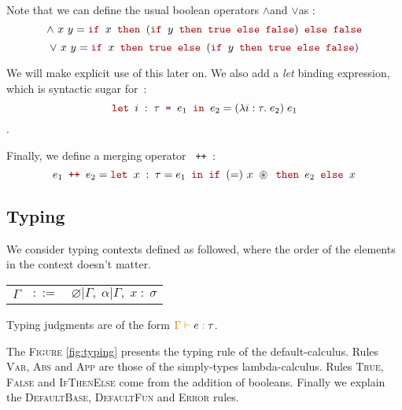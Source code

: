 \documentclass[11pt,a4paper]{article}
\newcommand{\synvar}[1]{\ensuremath{#1}}
\newcommand{\synkeyword}[1]{\textcolor{red!60!black}{\texttt{#1}}}
\newcommand{\synif}{\synkeyword{if~}}
\newcommand{\synthen}{\synkeyword{~then~}}
\newcommand{\synelse}{\synkeyword{~else~}}
\newcommand{\synlet}{\synkeyword{let~}}
\newcommand{\synin}{\synkeyword{~in~}}
\newcommand{\synequal}{\synkeyword{~=~}}
\newcommand{\syntrue}{\synkeyword{true}}
\newcommand{\synfalse}{\synkeyword{false}}
\newcommand{\synand}{\synvar{\wedge}}
\newcommand{\synor}{\synvar{\vee}}
\newcommand{\synmerge}{\synkeyword{~++~}}
\newcommand{\synerror}{\synvar{\circledast}}
\newcommand{\syndef}{$ ::= $}
\newcommand{\synalt}{\;$|$\;}
\newcommand{\syncolon}{\;:\;}
\newcommand{\synlambda}[3]{\ensuremath{\lambda#1:#2.\;#3}}
\newcommand{\typctx}[1]{\textcolor{orange!90!black}{\ensuremath{#1}}}
\newcommand{\typempty}{\typctx{\varnothing}}
\newcommand{\typcomma}{\typctx{,\;}}
\newcommand{\typvdash}{\typctx{\;\vdash\;}}
\newcommand{\typcolon}{\typctx{\;:\;}}
\begin{document}
Note that we can define the usual boolean operators \synand\;and \synor\;as :
$$\synand~\synvar{x}~\synvar{y} = \synif\synvar{x}\synthen(\synif\synvar{y}\synthen\syntrue\synelse\synfalse)\synelse\synfalse$$
$$\synor~\synvar{x}~\synvar{y} = \synif\synvar{x}\synthen\syntrue\synelse(\synif\synvar{y}\synthen\syntrue\synelse\synfalse)$$

We will make explicit use of this later on. We also add a \textit{let} binding expression, which is syntactic sugar for~:
$$\synlet\synvar{i}\syncolon\synvar{\tau}\synequal\synvar{e_1}\synin\synvar{e_2} = (\synlambda{i}{\tau}{e_2})\;\synvar{e_1}$$.

Finally, we define a merging operator \synmerge :
$$ \synvar{e_1}\synmerge\synvar{e_2}=\synlet\synvar{x}\syncolon\synvar{\tau}=\synvar{e_1}\synin\synif\synvar{(=)}~\synvar{x}~\synerror\synthen\synvar{e_2}\synelse\synvar{x} $$

\subsection{Typing}

We consider typing contexts defined as followed, where the order of the elements in the context doesn't matter.

\begin{center}
  \begin{tabular}{lrr}
    \typctx{\Gamma}&\syndef&\typempty\synalt\typctx{\Gamma}\typcomma\synvar{\alpha}\synalt\typctx{\Gamma}\typcomma\synvar{x}\typcolon\synvar{\sigma}
  \end{tabular}
\end{center}

Typing judgments are of the form $\typctx{\Gamma}\typvdash\synvar{e}\typcolon\synvar{\tau}$.

The \textsc{Figure} \ref{fig:typing} presents the typing rule of the default-calculus. Rules \textsc{Var}, \textsc{Abs} and \textsc{App} are those of the simply-types lambda-calculus. Rules \textsc{True}, \textsc{False} and \textsc{IfThenElse} come from the addition of booleans. Finally we explain the \textsc{DefaultBase}, \textsc{DefaultFun} and \textsc{Error} rules.
\end{document}
